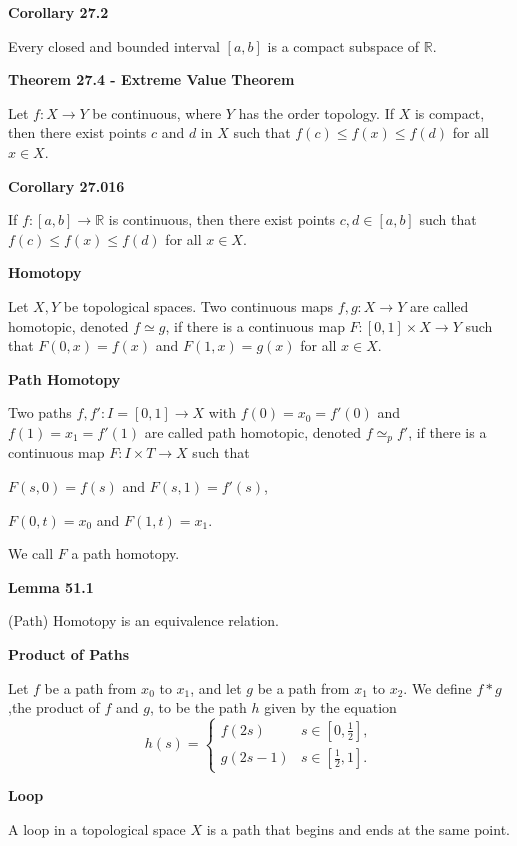 \documentclass{article}
\begin{document}
\medskip\noindent\textbf{Corollary 27.2}

    Every closed and bounded interval $[a,b]$ is a compact subspace of $\mathbb R$.

\medskip\noindent\textbf{Theorem 27.4 - Extreme Value Theorem}

    Let $f: X \to Y$ be continuous, where $Y$ has the order topology. If $X$ is compact, then there exist points $c$ and $d$ in $X$ such that $f(c) \leq f(x) \leq f(d)$ for all $x \in X$.

\medskip\noindent\textbf{Corollary 27.016}

    If $f: [a,b] \to \mathbb R$ is continuous, then there exist points $c,d \in [a,b]$ such that $f(c) \leq f(x) \leq f(d)$ for all $x \in X$.

\medskip\noindent\textbf{Homotopy}

    Let $X, Y$ be topological spaces.
    Two continuous maps $f,g:X \to Y$ are called homotopic, denoted $f \simeq g$, if there is a continuous map $F: [0,1] \times X \to Y$ such that $F(0,x) = f(x)$ and $F(1, x) = g(x)$ for all $x \in X$.

\medskip\noindent\textbf{Path Homotopy}

    Two paths $f, f': I=[0,1] \to X$ with $f(0) = x_0 = f'(0)$ and $f(1) = x_1 = f'(1)$ are called path homotopic, denoted $f \simeq_{p} f'$, if there is a continuous map $F: I \times T \to X$ such that 
    \begin{center}
        $F(s, 0) = f(s)$ and $F(s,1) = f'(s)$,

        $F(0, t) = x_0$ and $F(1, t) = x_1$.
    \end{center}

    We call $F$ a path homotopy.

\medskip\noindent\textbf{Lemma 51.1}

    (Path) Homotopy is an equivalence relation.

\medskip\noindent\textbf{Product of Paths}

    Let $f$ be a path from $x_0$ to $x_1$, and let $g$ be a path from $x_1$ to $x_2$.
    We define $f * g$,the product of $f$ and $g$, to be the path $h$ given by the equation $$h(s) = \begin{cases} f(2s) & s \in [0, \frac12], \\ g(2s-1) & s \in [\frac12, 1]. \end{cases}$$

\medskip\noindent\textbf{Loop}

    A loop in a topological space $X$ is a path that begins and ends at the same point.
\end{document}
